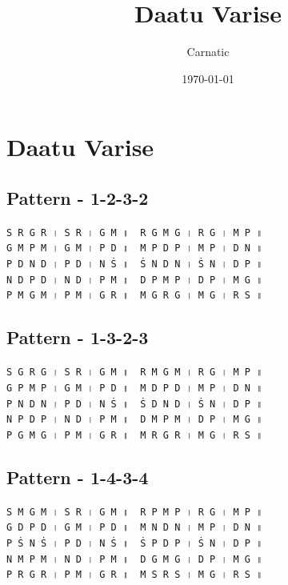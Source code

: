 \documentclass[12pt]{article}
\title{Daatu Varise}
\author{Carnatic}
\date{\today}
\newcommand{\df}[1]{{\devanagarifont#1}}
\begin{document}
\fontsize{18}{21}\selectfont

\section{Daatu Varise}
\subsection{Pattern - 1-2-3-2}
\texttt{S~R~G~R~\df{।}~S~R~\df{।}~G~M~\df{॥}~~R~G~M~G~\df{।}~R~G~\df{।}~M~P~\df{॥}}\\
\texttt{G~M~P~M~\df{।}~G~M~\df{।}~P~D~\df{॥}~~M~P~D~P~\df{।}~M~P~\df{।}~D~N~\df{॥}}\\
\texttt{P~D~N~D~\df{।}~P~D~\df{।}~N~Ṡ~\df{॥}~~Ṡ~N~D~N~\df{।}~Ṡ~N~\df{।}~D~P~\df{॥}}\\
\texttt{N~D~P~D~\df{।}~N~D~\df{।}~P~M~\df{॥}~~D~P~M~P~\df{।}~D~P~\df{।}~M~G~\df{॥}}\\
\texttt{P~M~G~M~\df{।}~P~M~\df{।}~G~R~\df{॥}~~M~G~R~G~\df{।}~M~G~\df{।}~R~S~\df{॥}}\\
\subsection{Pattern - 1-3-2-3}
\texttt{S~G~R~G~\df{।}~S~R~\df{।}~G~M~\df{॥}~~R~M~G~M~\df{।}~R~G~\df{।}~M~P~\df{॥}}\\
\texttt{G~P~M~P~\df{।}~G~M~\df{।}~P~D~\df{॥}~~M~D~P~D~\df{।}~M~P~\df{।}~D~N~\df{॥}}\\
\texttt{P~N~D~N~\df{।}~P~D~\df{।}~N~Ṡ~\df{॥}~~Ṡ~D~N~D~\df{।}~Ṡ~N~\df{।}~D~P~\df{॥}}\\
\texttt{N~P~D~P~\df{।}~N~D~\df{।}~P~M~\df{॥}~~D~M~P~M~\df{।}~D~P~\df{।}~M~G~\df{॥}}\\
\texttt{P~G~M~G~\df{।}~P~M~\df{।}~G~R~\df{॥}~~M~R~G~R~\df{।}~M~G~\df{।}~R~S~\df{॥}}\\
\subsection{Pattern - 1-4-3-4}
\texttt{S~M~G~M~\df{।}~S~R~\df{।}~G~M~\df{॥}~~R~P~M~P~\df{।}~R~G~\df{।}~M~P~\df{॥}}\\
\texttt{G~D~P~D~\df{।}~G~M~\df{।}~P~D~\df{॥}~~M~N~D~N~\df{।}~M~P~\df{।}~D~N~\df{॥}}\\
\texttt{P~Ṡ~N~Ṡ~\df{।}~P~D~\df{।}~N~Ṡ~\df{॥}~~Ṡ~P~D~P~\df{।}~Ṡ~N~\df{।}~D~P~\df{॥}}\\
\texttt{N~M~P~M~\df{।}~N~D~\df{।}~P~M~\df{॥}~~D~G~M~G~\df{।}~D~P~\df{।}~M~G~\df{॥}}\\
\texttt{P~R~G~R~\df{।}~P~M~\df{।}~G~R~\df{॥}~~M~S~R~S~\df{।}~M~G~\df{।}~R~S~\df{॥}}\\
\end{document}
